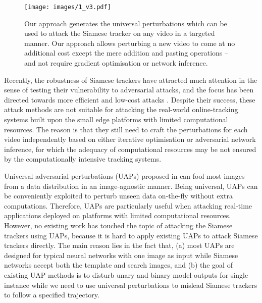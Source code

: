 \documentclass{article}
\begin{document}
\begin{figure}[htbp]
\centering
\texttt{[image: images/1\_v3.pdf]}
\caption{Our approach generates the universal perturbations which can be used to attack the Siamese tracker on any video in a targeted manner. Our approach allows perturbing a new video to come at no additional cost except the mere addition and pasting operations -- and not require gradient optimisation or network inference.}
\end{figure}

Recently, the robustness of Siamese trackers have attracted much attention in the sense of testing their vulnerability to adversarial attacks, and the focus has been directed towards more efficient and low-cost attacks \cite{TemporallyTransferablePerturbations,efficient,SPARK}. Despite their success, these attack methods are not suitable for attacking the real-world online-tracking systems built upon the small edge platforms with limited computational resources. The reason is that they still need to craft the perturbations for each video independently based on either iterative optimisation or adversarial network inference, for which the adequacy of computational resources may be not ensured by the computationally intensive tracking systems. 

Universal adversarial perturbations (UAPs) proposed in \cite{UAP} can fool most images from a data distribution in an image-agnostic manner. Being universal, UAPs can be conveniently exploited to perturb unseen data on-the-fly without extra computations. Therefore, UAPs are particularly useful when attacking real-time applications deployed on platforms with limited computational resources. However, no existing work has touched the topic of attacking the Siamese trackers using UAPs, because it is hard to apply existing UAPs to attack Siamese trackers directly. The main reason lies in the fact that, (a) most UAPs are designed for typical neural networks with one image as input while Siamese networks accept both the template and search images, and (b) the goal of existing UAP methods is to disturb unary and binary model outputs for single instance while we need to use universal perturbations to mislead Siamese trackers to follow a specified trajectory.
\end{document}
